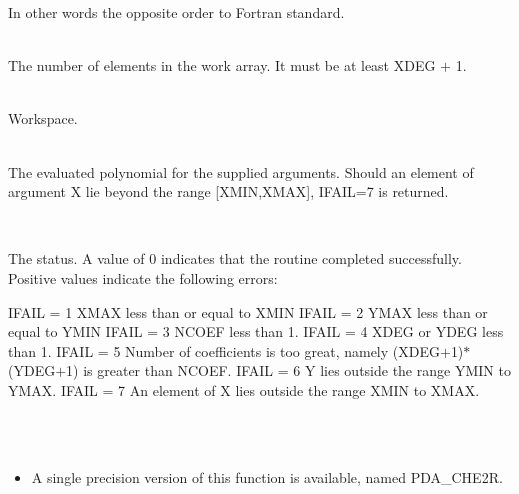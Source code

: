 \documentclass[11pt,twoside]{article}
\newcommand{\sstsubsection}[1]{ \item[{#1}] \mbox{} \\}
\newcommand{\sstnotes}[1]{\item[Notes:] \mbox{} \\[1.3ex] #1}
\newcommand{\sstitemlist}[1]{
  \mbox{} \\
  \vspace{-3.5ex}
  \begin{itemize}
     #1
  \end{itemize}
}
\newcommand{\sstitem}{\item}
\newcommand{\sstsubsection}[1]{\item[{#1}]}
\newcommand{\sstnotes}[1]{\item[Notes:] #1 }
\newcommand{\sstitemlist}[1]{
      \begin{itemize}
         #1
      \end{itemize}
      \\
   }
\newcommand{\sstitem}{\item}
\begin{document}
{{{         In other words the opposite order to Fortran standard.
      }
      \sstsubsection{
         NW = INTEGER (Given)
      }{
         The number of elements in the work array.  It must be at least
         XDEG $+$ 1.
      }
      \sstsubsection{
         WORK( NW ) = DOUBLE PRECISION (Returned)
      }{
         Workspace.
      }
      \sstsubsection{
         EVAL( NPTS ) = DOUBLE PRECISION (Returned)
      }{
         The evaluated polynomial for the supplied arguments.  Should an
         element of argument X lie beyond the range [XMIN,XMAX], IFAIL=7
         is returned.
      }
      \sstsubsection{
         IFAIL = INTEGER (Returned)
      }{
         The status.  A value of 0 indicates that the routine completed
         successfully.  Positive values indicate the following errors:

            IFAIL = 1    XMAX less than or equal to XMIN
            IFAIL = 2    YMAX less than or equal to YMIN
            IFAIL = 3    NCOEF less than 1.
            IFAIL = 4    XDEG or YDEG less than 1.
            IFAIL = 5    Number of coefficients is too great, namely
                         (XDEG$+$1)$*$(YDEG$+$1) is greater than NCOEF.
            IFAIL = 6    Y lies outside the range YMIN to YMAX.
            IFAIL = 7    An element of X lies outside the range XMIN to
                         XMAX.
      }
   }
   \sstnotes{
      \sstitemlist{

         \sstitem
         A single precision version of this function is available, named
         PDA\_CHE2R.
      }
   }
}
\end{document}
